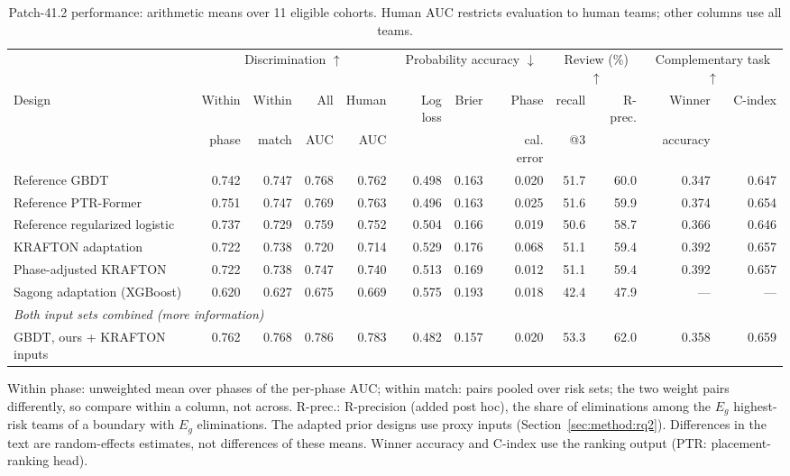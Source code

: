 \begin{table}[t]
\centering\footnotesize
\caption{Patch-41.2 performance: arithmetic means over 11 eligible cohorts. Human AUC restricts evaluation to human teams; other columns use all teams.}
\label{tab:main}
\setlength{\tabcolsep}{2.5pt}
\begin{tabular*}{\textwidth}{@{\extracolsep{\fill}}lrrrrrrrrrrr@{}}
\toprule
 & \multicolumn{4}{c}{Discrimination $\uparrow$} & \multicolumn{3}{c}{Probability accuracy $\downarrow$} & \multicolumn{2}{c}{Review (\%) $\uparrow$} & \multicolumn{2}{c}{Complementary task $\uparrow$} \\
\cmidrule(lr){2-5}\cmidrule(lr){6-8}\cmidrule(lr){9-10}\cmidrule(lr){11-12}
Design & Within & Within & All & Human & Log loss & Brier & Phase & recall & R-prec. & Winner & C-index \\
 & phase & match & AUC & AUC &  &  & cal. error & @3 &  & accuracy &  \\
\midrule
Reference GBDT & 0.742 & 0.747 & 0.768 & 0.762 & 0.498 & 0.163 & 0.020 & 51.7 & 60.0 & 0.347 & 0.647 \\
Reference PTR-Former & 0.751 & 0.747 & 0.769 & 0.763 & 0.496 & 0.163 & 0.025 & 51.6 & 59.9 & 0.374 & 0.654 \\
Reference regularized logistic & 0.737 & 0.729 & 0.759 & 0.752 & 0.504 & 0.166 & 0.019 & 50.6 & 58.7 & 0.366 & 0.646 \\
KRAFTON adaptation & 0.722 & 0.738 & 0.720 & 0.714 & 0.529 & 0.176 & 0.068 & 51.1 & 59.4 & 0.392 & 0.657 \\
Phase-adjusted KRAFTON & 0.722 & 0.738 & 0.747 & 0.740 & 0.513 & 0.169 & 0.012 & 51.1 & 59.4 & 0.392 & 0.657 \\
Sagong adaptation (XGBoost) & 0.620 & 0.627 & 0.675 & 0.669 & 0.575 & 0.193 & 0.018 & 42.4 & 47.9 & --- & --- \\
\midrule
\multicolumn{12}{l}{\emph{Both input sets combined (more information)}} \\
GBDT, ours + KRAFTON inputs & 0.762 & 0.768 & 0.786 & 0.783 & 0.482 & 0.157 & 0.020 & 53.3 & 62.0 & 0.358 & 0.659 \\
\bottomrule
\end{tabular*}
\smallskip
\parbox{\textwidth}{\scriptsize Within phase: unweighted mean over phases of the per-phase AUC; within match: pairs pooled over risk sets; the two weight pairs differently, so compare within a column, not across. R-prec.: R-precision (added post hoc), the share of eliminations among the $E_g$ highest-risk teams of a boundary with $E_g$ eliminations. The adapted prior designs use proxy inputs (Section~\ref{sec:method:rq2}). Differences in the text are random-effects estimates, not differences of these means. Winner accuracy and C-index use the ranking output (PTR: placement-ranking head).}
\end{table}
